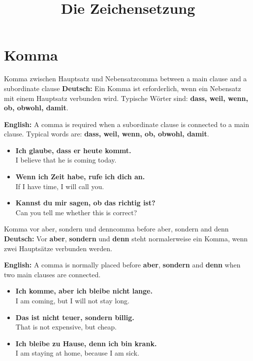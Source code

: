 \documentclass[a4paper,11pt]{article}
\title{Die Zeichensetzung}
\date{}
\newcommand{\GermanText}[1]{\textbf{Deutsch: }#1\par}
\newcommand{\EnglishText}[1]{{\small\color{SoftGray}\textbf{English: }#1\par}}
\newcommand{\ExampleItem}[2]{\item \textbf{#1}\\{\small\color{SoftGray}#2}}
\begin{document}
    \maketitle
    \tableofcontents
    \newpage
    
    
    \section{Komma}
        
        \begin{grammarentry}{Komma zwischen Hauptsatz und Nebensatz}{comma between a main clause and a subordinate clause}
            \GermanText{Ein Komma ist erforderlich, wenn ein Nebensatz mit einem Hauptsatz verbunden wird. Typische Wörter sind: \textbf{dass, weil, wenn, ob, obwohl, damit}.}
            \EnglishText{A comma is required when a subordinate clause is connected to a main clause. Typical words are: \textbf{dass, weil, wenn, ob, obwohl, damit}.}
            
            \begin{exbox}
                \begin{itemize}
                    \ExampleItem{Ich glaube, dass er heute kommt.}{I believe that he is coming today.}
                    \ExampleItem{Wenn ich Zeit habe, rufe ich dich an.}{If I have time, I will call you.}
                    \ExampleItem{Kannst du mir sagen, ob das richtig ist?}{Can you tell me whether this is correct?}
                \end{itemize}
            \end{exbox}
        \end{grammarentry}
        
        \begin{grammarentry}{Komma vor aber, sondern und denn}{comma before aber, sondern and denn}
            \GermanText{Vor \textbf{aber}, \textbf{sondern} und \textbf{denn} steht normalerweise ein Komma, wenn zwei Hauptsätze verbunden werden.}
            \EnglishText{A comma is normally placed before \textbf{aber}, \textbf{sondern} and \textbf{denn} when two main clauses are connected.}
            
            \begin{exbox}
                \begin{itemize}
                    \ExampleItem{Ich komme, aber ich bleibe nicht lange.}{I am coming, but I will not stay long.}
                    \ExampleItem{Das ist nicht teuer, sondern billig.}{That is not expensive, but cheap.}
                    \ExampleItem{Ich bleibe zu Hause, denn ich bin krank.}{I am staying at home, because I am sick.}
                \end{itemize}
            \end{exbox}
        \end{grammarentry}
        
\end{document}
